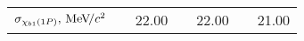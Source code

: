 \begin{table}[H]
{{\begin{tabular}{lrrrrrrrrr}


    \rule{0pt}{4ex}$\sigma_{\chi_{b1}(1P)}, {\mathrm{\,Me\kern -0.1em V\!/}c^2}$  && \multicolumn{2}{c}{22.00} && \multicolumn{2}{c}{22.00} && \multicolumn{2}{c}{21.00} \\




\end{tabular}}}
\end{table}
